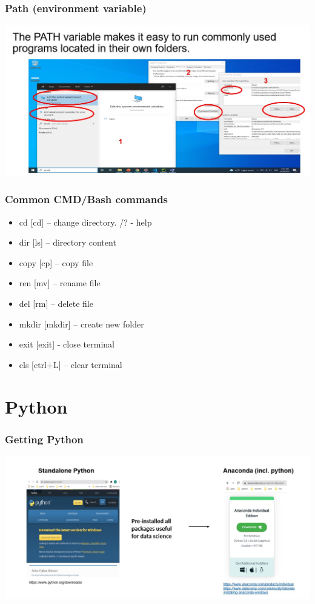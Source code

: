 \documentclass{beamer}
\begin{document}
\begin{frame}
    \frametitle{Path (environment variable)}
    \centering
    \includegraphics[scale = 0.5]{figures/path.jpg}
\end{frame}

\begin{frame}
    \frametitle{Common CMD/Bash commands}
    \begin{itemize}
        \item cd [cd] – change directory. /? - help
        \item dir [ls] – directory content
        \item copy [cp] – copy file
        \item ren [mv] – rename file
        \item del [rm] – delete file
        \item mkdir [mkdir] – create new folder
        \item exit [exit] - close terminal
        \item cls [ctrl+L] – clear terminal
    \end{itemize}
\end{frame}


\section{Python} 

\begin{frame}
    \frametitle{Getting Python}
    \centering
    \includegraphics[scale = 0.35]{figures/getpython.jpg}
\end{frame}
\end{document}
